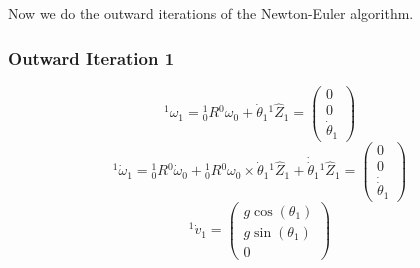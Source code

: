 \documentclass[10pt,a4paper]{article}
\begin{document}
Now we do the outward iterations of the Newton-Euler algorithm.

\subsubsection*{Outward Iteration 1}

\begin{equation*}
  {}^{1}\omega_{1} = {}_{0}^{1}R {}^{0}\omega_{0} + \dot{\theta}_{1} {}^{1}\hat{Z}_{1} = \begin{pmatrix}
    0\\0\\\dot{\theta}_{1}
  \end{pmatrix}
\end{equation*}
\begin{equation*}
  {}^{1}\dot{\omega}_{1} = {}^{1}_{0}R {}^{0}\dot{\omega}_{0} + {}^{1}_{0}R {}^{0}\omega_{0} \times \dot{\theta}_{1} {}^{1}\hat{Z}_{1} + \dot{\dot{\theta}}_{1} {}^{1}\hat{Z}_{1} = \begin{pmatrix}
    0\\0\\\dot{\dot{\theta}}_{1}
  \end{pmatrix}
\end{equation*}
\begin{equation*}
  {}^{1}\dot{v}_{1} = \begin{pmatrix}
    g\cos(\theta_{1})\\g\sin(\theta_{1})\\0
  \end{pmatrix}
\end{equation*}
\end{document}
